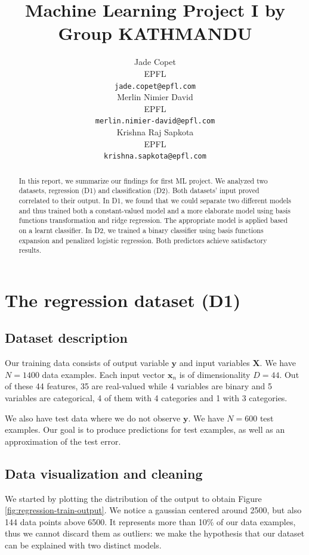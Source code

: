 \documentclass{article} %
\title{Machine Learning Project I by Group KATHMANDU}
\author{
  Jade Copet\\
  EPFL \\
  \texttt{jade.copet@epfl.com} \\
  \And
  Merlin Nimier David\\
  EPFL \\
  \texttt{merlin.nimier-david@epfl.com} \\
  \And
  Krishna Raj Sapkota\\
  EPFL \\
  \texttt{krishna.sapkota@epfl.com} \\
}
\begin{document}
\maketitle



\begin{abstract}
  In this report, we summarize our findings for first ML project. We analyzed two datasets, regression (D1) and classification (D2). Both datasets' input proved correlated to their output. In D1, we found that we could separate two different models and thus trained both a constant-valued model and a more elaborate model using basis functions transformation and ridge regression. The appropriate model is applied based on a learnt classifier. In D2, we trained a binary classifier using basis functions expansion and penalized logistic regression. Both predictors achieve satisfactory results.
\end{abstract}



\section{The regression dataset (D1)}

  \subsection{Dataset description}
  Our training data consists of output variable $\mathbf{y}$ and input variables $\mathbf{X}$. We have $N = 1400$ data examples. Each input vector $\mathbf{x}_n$ is of dimensionality $D = 44$. Out of these 44 features, 35 are real-valued while 4 variables are binary and 5 variables are categorical, 4 of them with 4 categories and 1 with 3 categories.

  We also have test data where we do not observe $\mathbf{y}$. We have $N = 600$ test examples. Our goal is to produce predictions for test examples, as well as an approximation of the test error.

  \subsection{Data visualization and cleaning}
  We started by plotting the distribution of the output to obtain Figure \ref{fig:regression-train-output}. We notice a gaussian centered around 2500, but also 144 data points above 6500. It represents more than 10\% of our data examples, thus we cannot discard them as outliers: we make the hypothesis that our dataset can be explained with two distinct models.
\end{document}
